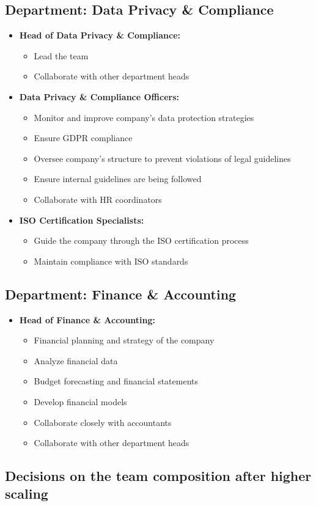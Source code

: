 \subsection{Department: Data Privacy \& Compliance}
\begin{itemize}
    \item \textbf{Head of Data Privacy \& Compliance:}
            \begin{itemize}
                \item Lead the team
                \item Collaborate with other department heads
            \end{itemize}    
    \item \textbf{Data Privacy \& Compliance Officers:}
            \begin{itemize}
                \item Monitor and improve company’s data protection strategies
                \item Ensure GDPR compliance
                \item Oversee company’s structure to prevent violations of legal guidelines
                \item Ensure internal guidelines are being followed
                \item Collaborate with HR coordinators
            \end{itemize}
    \item \textbf{ISO Certification Specialists:}
            \begin{itemize}
                \item Guide the company through the ISO certification process
                \item Maintain compliance with ISO standards
            \end{itemize}
\end{itemize}

\subsection{Department: Finance \& Accounting}
\begin{itemize}
    \item \textbf{Head of Finance \& Accounting:}
            \begin{itemize}
                \item Financial planning and strategy of the company
                \item Analyze financial data
                \item Budget forecasting and financial statements
                \item Develop financial models
                \item Collaborate closely with accountants
                \item Collaborate with other department heads
            \end{itemize}
\end{itemize}

\subsection{Decisions on the team composition after higher scaling}
\label{sub:decision_on_team_comp_highscaled}

